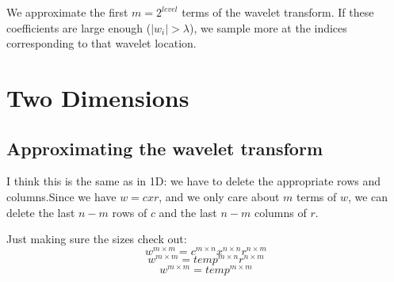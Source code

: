 \documentclass{article}
\begin{document}
        We approximate the first $m=2^{level}$ terms of the wavelet transform. If these coefficients are large enough ($|w_i|> \lambda$), we sample more at the indices corresponding to that wavelet location.


    \section{Two Dimensions}
            


            
        \subsection{Approximating the wavelet transform}
            I think this is the same as in 1D: we have to delete the appropriate rows and columns.Since we have $w = c x r$, and we only care about $m$ terms of $w$, we can delete the last $n-m$ rows of $c$ and the last $n-m$ columns of $r$.

            Just making sure the sizes check out:
            $$ w^{m\times m} = c^{m\times n} x^{n \times n} r^{n \times m} $$
            $$ w^{m\times m} = temp^{m \times n} r^{n \times m} $$
            $$ w^{m\times m} = temp^{m \times m}$$
\end{document}

